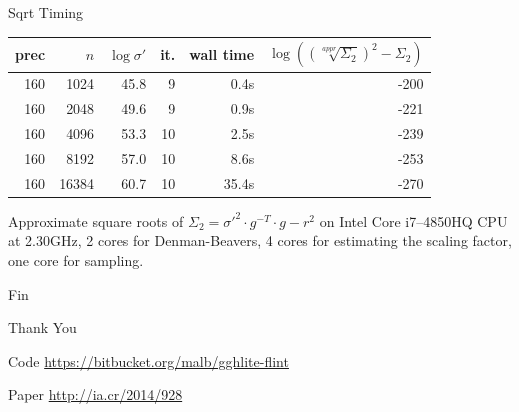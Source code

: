 \documentclass[presentation,smaller]{beamer}
\begin{document}
\begin{frame}[label={sec:orgheadline58}]{Sqrt Timing}
\begin{center}
\begin{tabular}{rrrrrr}
prec & \(n\) & \(\log σ'\) & it. & wall time & \(\log\left( {(\sqrt[appr]{Σ_2})}^2 - Σ_2\right)\)\\
\hline
160 & 1024 & 45.8 & 9 & 0.4s & -200\\
160 & 2048 & 49.6 & 9 & 0.9s & -221\\
160 & 4096 & 53.3 & 10 & 2.5s & -239\\
160 & 8192 & 57.0 & 10 & 8.6s & -253\\
160 & 16384 & 60.7 & 10 & 35.4s & -270\\
\end{tabular}

\end{center}

Approximate square roots of \(\varSigma_2 = σ'^2 \cdot g^{-T} \cdot g - r^2\) on Intel Core i7--4850HQ CPU at 2.30GHz, 2 cores for Denman-Beavers, 4 cores for estimating the scaling factor, one core for sampling.
\end{frame}


\begin{frame}[label={sec:orgheadline59}]{Fin}
\begin{center}
\begin{Huge}
\alert{Thank You}
\end{Huge}
\end{center}

\alert{Code} \url{https://bitbucket.org/malb/gghlite-flint}

\alert{Paper} \url{http://ia.cr/2014/928}
\end{frame}
\end{document}
